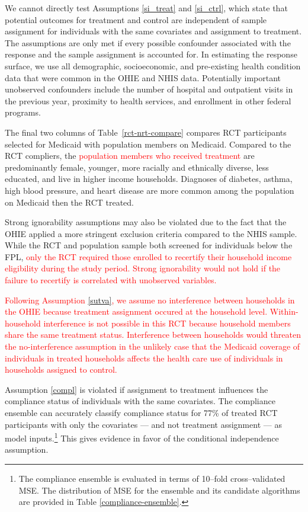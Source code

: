 \documentclass[hidelinks,12pt]{article}
\begin{document}
We cannot directly test Assumptions \eqref{si_treat} and \eqref{si_ctrl}, which state that potential outcomes for treatment and control are independent of sample assignment for individuals with the same covariates and assignment to treatment. The assumptions are only met if every possible confounder associated with the response and the sample assignment is accounted for. In estimating the response surface, we use all demographic, socioeconomic, and pre-existing health condition data that were common in the OHIE and NHIS data. Potentially important unobserved confounders include the number of hospital and outpatient visits in the previous year, proximity to health services, and enrollment in other federal programs. 

The final two columns of Table~\ref{rct-nrt-compare} compares RCT participants selected for Medicaid with population members on Medicaid. Compared to the RCT compliers, the \textcolor{red}{population members who received treatment} are predominantly female, younger, more racially and ethnically diverse, less educated, and live in higher income households. Diagnoses of diabetes, asthma, high blood pressure, and heart disease are more common among the population on Medicaid then the RCT treated.

Strong ignorability assumptions may also be violated due to the fact that the OHIE applied a more stringent exclusion criteria compared to the NHIS sample. While the RCT and population sample both screened for individuals below the FPL,  \textcolor{red}{only the RCT required those enrolled to recertify their household income eligibility during the study period. Strong ignorability would not hold if the failure to recertify is correlated with unobserved variables.} 

\textcolor{red}{Following Assumption \ref{sutva}, we assume no interference between households in the OHIE because treatment assignment occured at the household level. Within-household interference is not possible in this RCT because household members share the same treatment status. Interference between households would threaten the no-interference assumption in the unlikely case that the Medicaid coverage of individuals in treated households affects the health care use of individuals in households assigned to control.} 

Assumption \eqref{compl} is violated if assignment to treatment influences the compliance status of individuals with the same covariates. The compliance ensemble can accurately classify compliance status for 77\% of treated RCT participants with only the covariates --- and not treatment assignment --- as model inputs.\footnote{The compliance ensemble is evaluated in terms of 10--fold cross--validated MSE. The distribution of MSE for the ensemble and its candidate algorithms are provided in Table \ref{compliance-ensemble}.}  This gives evidence in favor of the conditional independence assumption.
\end{document}
